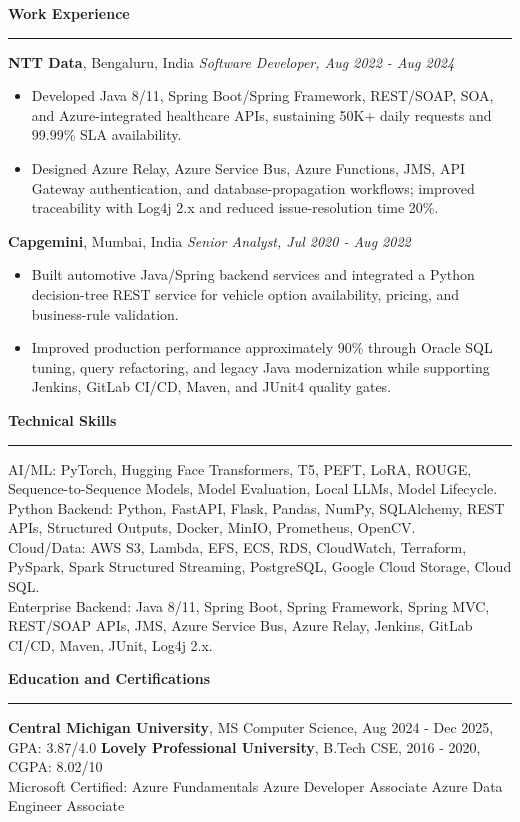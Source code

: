 \documentclass[10pt,letterpaper]{article}
\newcommand{\ressection}[1]{\vspace{3pt}\par\textbf{#1}\par\vspace{1pt}\hrule\vspace{2pt}}
\begin{document}
\ressection{Work Experience}
\textbf{NTT Data}, Bengaluru, India \hfill \textit{Software Developer, Aug 2022 - Aug 2024}
\begin{itemize}
  \item Developed Java 8/11, Spring Boot/Spring Framework, REST/SOAP, SOA, and Azure-integrated healthcare APIs, sustaining 50K+ daily requests and 99.99\% SLA availability.
  \item Designed Azure Relay, Azure Service Bus, Azure Functions, JMS, API Gateway authentication, and database-propagation workflows; improved traceability with Log4j 2.x and reduced issue-resolution time 20\%.
\end{itemize}
\textbf{Capgemini}, Mumbai, India \hfill \textit{Senior Analyst, Jul 2020 - Aug 2022}
\begin{itemize}
  \item Built automotive Java/Spring backend services and integrated a Python decision-tree REST service for vehicle option availability, pricing, and business-rule validation.
  \item Improved production performance approximately 90\% through Oracle SQL tuning, query refactoring, and legacy Java modernization while supporting Jenkins, GitLab CI/CD, Maven, and JUnit4 quality gates.
\end{itemize}

\ressection{Technical Skills}
AI/ML: PyTorch, Hugging Face Transformers, T5, PEFT, LoRA, ROUGE, Sequence-to-Sequence Models, Model Evaluation, Local LLMs, Model Lifecycle.\\
Python Backend: Python, FastAPI, Flask, Pandas, NumPy, SQLAlchemy, REST APIs, Structured Outputs, Docker, MinIO, Prometheus, OpenCV.\\
Cloud/Data: AWS S3, Lambda, EFS, ECS, RDS, CloudWatch, Terraform, PySpark, Spark Structured Streaming, PostgreSQL, Google Cloud Storage, Cloud SQL.\\
Enterprise Backend: Java 8/11, Spring Boot, Spring Framework, Spring MVC, REST/SOAP APIs, JMS, Azure Service Bus, Azure Relay, Jenkins, GitLab CI/CD, Maven, JUnit, Log4j 2.x.

\ressection{Education and Certifications}
\textbf{Central Michigan University}, MS Computer Science, Aug 2024 - Dec 2025, GPA: 3.87/4.0 \textbar{} \textbf{Lovely Professional University}, B.Tech CSE, 2016 - 2020, CGPA: 8.02/10\\
Microsoft Certified: Azure Fundamentals \textbar{} Azure Developer Associate \textbar{} Azure Data Engineer Associate
\end{document}
